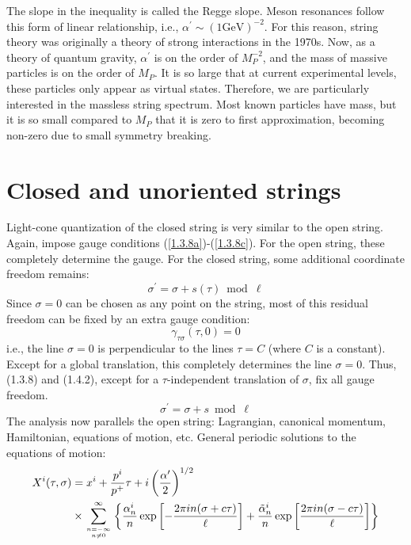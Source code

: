 The slope in the inequality is called the Regge slope. Meson resonances follow this form of linear relationship, i.e., $\alpha^{\prime} \sim(1 \mathrm{GeV})^{-2}$. For this reason, string theory was originally a theory of strong interactions in the 1970s. Now, as a theory of quantum gravity, $\alpha^\prime$ is on the order of $M_P^{-2}$, and the mass of massive particles is on the order of $M_P$. 
It is so large that at current experimental levels, these particles only appear as virtual states. Therefore, we are particularly interested in the massless string spectrum. 
Most known particles have mass, but it is so small compared to $M_P$ that it is zero to first approximation, becoming non-zero due to small symmetry breaking. 

\section{\texorpdfstring{Closed and unoriented strings}{Closed and unoriented strings}} \label{sec:1.4}
Light-cone quantization of the closed string is very similar to the open string. Again, impose gauge conditions (\ref{1.3.8a})-(\ref{1.3.8c}). For the open string, these completely determine the gauge. 
For the closed string, some additional coordinate freedom remains: 
\begin{equation}
	\sigma^{\prime}=\sigma+s(\tau) \bmod \ell
\end{equation}
Since $\sigma=0$ can be chosen as any point on the string, most of this residual freedom can be fixed by an extra gauge condition: 
\begin{equation}
	\gamma_{\tau \sigma}(\tau, 0)=0
\end{equation}
i.e., the line $\sigma=0$ is perpendicular to the lines $\tau=C$ (where $C$ is a constant). Except for a global translation, this completely determines the line $\sigma=0$. Thus, (1.3.8) and (1.4.2), except for a $\tau$-independent translation of $\sigma$, fix all gauge freedom. 
\begin{equation}
	\sigma^{\prime}=\sigma+s \bmod \ell   \label{sigma-translation}
\end{equation}
The analysis now parallels the open string: Lagrangian, canonical momentum, Hamiltonian, equations of motion, etc. General periodic solutions to the equations of motion: 
\begin{equation}
	\begin{aligned}
		X^{i}(\tau, \sigma) &=x^{i}+\frac{p^{i}}{p^{+}} \tau+i\left(\frac{\alpha^{\prime}}{2}\right)^{1 / 2} \\
		& \times \sum_{n=-\infty \atop n \neq 0}^{\infty}\left\{\frac{\alpha_{n}^{i}}{n} \exp \left[-\frac{2 \pi i n(\sigma+c \tau)}{\ell}\right]+\frac{\tilde{\alpha}_{n}^{i}}{n} \exp \left[\frac{2 \pi i n(\sigma-c \tau)}{\ell}\right]\right\} \label{general-periodic-solution}
	\end{aligned}
\end{equation}
